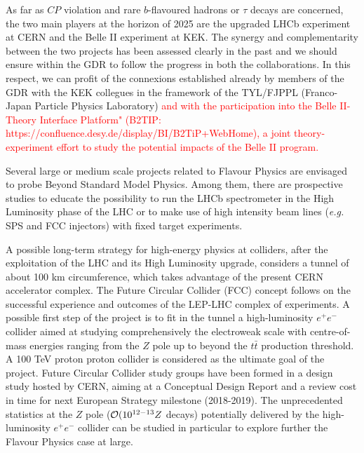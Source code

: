 As far as $CP$ violation and rare $b$-flavoured hadrons or $\tau$ decays are concerned, the two main players at the horizon of 2025 are the  upgraded LHCb experiment at CERN and the Belle II experiment at KEK.  The synergy and complementarity between the two projects has been assessed clearly in the past and we should ensure within the GDR to follow the progress in both the collaborations. In this respect, we can profit of the connexions established already by members of the GDR with the KEK collegues in the framework of the TYL/FJPPL (Franco-Japan Particle Physics Laboratory) \textcolor{red}{and with the participation into the Belle II-Theory Interface Platform" (B2TIP: https://confluence.desy.de/display/BI/B2TiP+WebHome), a joint theory-experiment effort to study the potential impacts of the Belle II program.}

Several large or medium scale projects related to Flavour Physics are envisaged to probe Beyond Standard Model Physics. Among them, there are prospective studies to educate the possibility to run the LHCb spectrometer in the High Luminosity phase of the LHC or to make use of high intensity beam lines ({\it e.g.} SPS and FCC injectors)  with fixed target experiments.            

A possible long-term strategy for high-energy physics at colliders, after the exploitation of the LHC and its High Luminosity upgrade, considers a tunnel of about 100 km circumference, which takes advantage of the present CERN accelerator complex. The Future Circular Collider (FCC) concept follows on the successful experience and outcomes of the LEP-LHC complex of experiments. A possible first step of the project is to fit in the tunnel a high-luminosity $e^+e^-$ collider aimed at studying comprehensively the electroweak scale with centre-of-mass energies ranging from the $Z$ pole up to beyond the $t \bar t$ production threshold. A  100 TeV proton proton collider is considered as the ultimate goal of the project.  
Future Circular Collider study groups have been formed in a design study hosted by CERN, aiming at a Conceptual Design Report and a review cost in time for next European Strategy milestone (2018-2019). The unprecedented statistics at the $Z$ pole (${\cal O}(10^{12-13} Z$ decays) potentially delivered by the high-luminosity $e^+e^-$ collider can be studied in particular to explore further the Flavour Physics case at large.  

